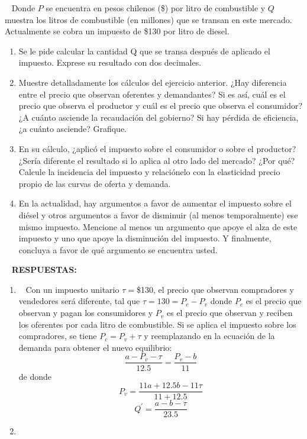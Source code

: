 \documentclass[
  letterpaper,
  DIV=11,
  numbers=noendperiod]{scrreport}
\begin{document}
~ Donde \(P\) se encuentra en pesos chilenos (\$) por litro de
combustible y \(Q\) muestra los litros de combustible (en millones) que
se transan en este mercado. Actualmente se cobra un impuesto de \$130
por litro de diesel.

\begin{enumerate}
\def\labelenumi{\alph{enumi})}
\item
  Se le pide calcular la cantidad Q que se transa después de aplicado el
  impuesto. Exprese su resultado con dos decimales.
\item
  Muestre detalladamente los cálculos del ejercicio anterior. ¿Hay
  diferencia entre el precio que observan oferentes y demandantes? Si es
  así, cuál es el precio que observa el productor y cuál es el precio
  que observa el consumidor? ¿A cuánto asciende la recaudación del
  gobierno? Si hay pérdida de eficiencia, ¿a cuánto asciende? Grafique.
\item
  En su cálculo, ¿aplicó el impuesto sobre el consumidor o sobre el
  productor? ¿Sería diferente el resultado si lo aplica al otro lado del
  mercado? ¿Por qué? Calcule la incidencia del impuesto y relaciónelo
  con la elasticidad precio propio de las curvas de oferta y demanda.
\item
  En la actualidad, hay argumentos a favor de aumentar el impuesto sobre
  el diésel y otros argumentos a favor de disminuir (al menos
  temporalmente) ese mismo impuesto. Mencione al menos un argumento que
  apoye el alza de este impuesto y uno que apoye la disminución del
  impuesto. Y finalmente, concluya a favor de qué argumento se encuentra
  usted.
\end{enumerate}

~ \textbf{RESPUESTAS:}

\begin{enumerate}
\def\labelenumi{\alph{enumi})}
\item
  ~ Con un impuesto unitario \(\tau=\)\$130, el precio que observan
  compradores y vendedores será diferente, tal que
  \(\tau=130=P_c - P_v\) donde \(P_c\) es el precio que observan y pagan
  los consumidores y \(P_v\) es el precio que observan y reciben los
  oferentes por cada litro de combustible. Si se aplica el impuesto
  sobre los compradores, se tiene \(P_c= P_v+\tau\) y reemplazando en la
  ecuación de la demanda para obtener el nuevo equilibrio:
  \[ \frac{a-P_v-\tau}{12.5}=\frac{P_v-b}{11}\] de donde
  \[P_v = \frac{11a+12.5b-11\tau}{11+12.5}\]
  \[Q^\prime=\frac{a-b-\tau}{23.5}\]
\item
\end{enumerate}
\end{document}
